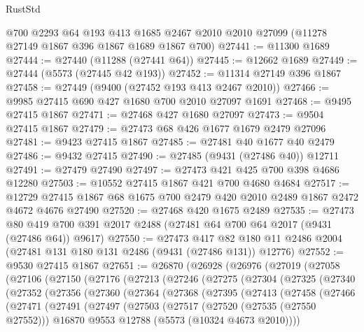\begin{lexlean}{RustStd}
\begin{coremodule}
    @700
    @2293
    @64
    @193
    @413
    @1685
    @2467
    @2010
    @2010
    @27099
    (@11278 @27149 @1867 @396 @1867 @1689 @1867 @700)
@27441 := @11300 @1689
@27444 := @27440 (@11288 (@27441 @64))
@27445 := @12662 @1689
@27449 := @27444 (@5573 (@27445 @42 @193))
@27452 := @11314 @27149 @396 @1867
@27458 := @27449 (@9400 (@27452 @193 @413 @2467 @2010))
@27466 := @9985 @27415 @690 @427 @1680 @700 @2010 @27097 @1691
@27468 := @9495 @27415 @1867
@27471 := @27468 @427 @1680 @27097
@27473 := @9504 @27415 @1867
@27479 := @27473 @68 @426 @1677 @1679 @2479 @27096
@27481 := @9423 @27415 @1867
@27485 := @27481 @40 @1677 @40 @2479
@27486 := @9432 @27415
@27490 := @27485 (@9431 (@27486 @40)) @12711
@27491 := @27479 @27490
@27497 := @27473 @421 @425 @700 @398 @4686 @12280
@27503 := @10552 @27415 @1867 @421 @700 @4680 @4684
@27517 := @12729 @27415 @1867 @68 @1675 @700 @2479 @420 @2010 @2489 @1867 @2472 @4672 @4676 @27490
@27520 := @27468 @420 @1675 @2489
@27535 := @27473
    @80
    @419
    @700
    @391
    @2017
    @2488
    (@27481 @64 @700 @64 @2017 (@9431 (@27486 @64)) @9617)
@27550 := @27473
    @417
    @82
    @180
    @11
    @2486
    @2004
    (@27481 @131 @180 @131 @2486 (@9431 (@27486 @131)) @12776)
@27552 := @9530 @27415 @1867
@27651 := @26870
    (@26928
      (@26976
        (@27019
          (@27058
            (@27106
              (@27150
                (@27176
                  (@27213
                    (@27246
                      (@27275
                        (@27304
                          (@27325
                            (@27340
                              (@27352
                                (@27356
                                  (@27360
                                    (@27364
                                      (@27368
                                        (@27395
                                          (@27413
                                            (@27458
                                              (@27466
                                                (@27471
                                                  (@27491
                                                    (@27497
                                                      (@27503
                                                        (@27517
                                                          (@27520 (@27535 (@27550 @27552)))
                                                          @16870
                                                          @9553
                                                          @12788
                                                          (@5573 (@10324 @4673 @2010))))

\end{coremodule}
\end{lexlean}
